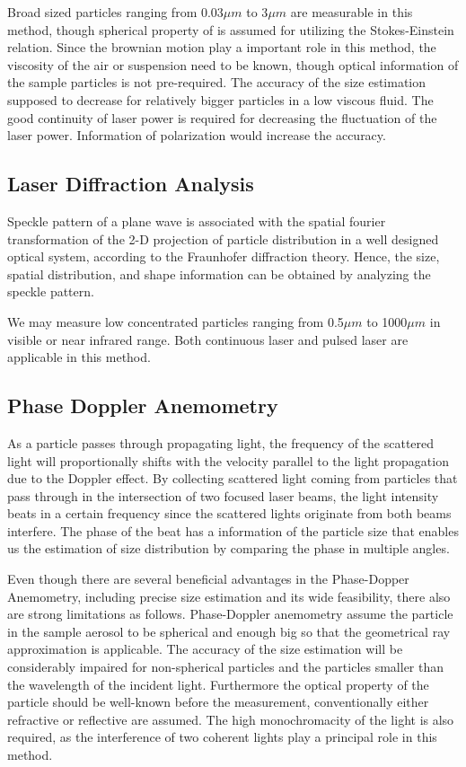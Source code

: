 \documentclass[12pt]{article}
\begin{document}
Broad sized particles ranging from 0.03$\mu m$ to 3$\mu m$ are measurable in this method, though spherical property of  is assumed for utilizing the Stokes-Einstein relation.
Since the brownian motion play a important role in this method, the viscosity of the air or suspension need to be known, though optical information of the sample particles is not pre-required. The accuracy of the size estimation supposed to decrease for relatively bigger particles in a low viscous fluid.
The good continuity of laser power is required for decreasing the fluctuation of the laser power. Information of polarization would increase the accuracy\cite{Depolarized_DLS}.

\subsection{Laser Diffraction Analysis}
Speckle pattern of a plane wave is associated with the spatial fourier transformation of the 2-D projection of particle distribution in a well designed optical system, according to the Fraunhofer diffraction theory. Hence, the size, spatial distribution, and shape information can be obtained by analyzing the speckle pattern\cite{LD_size_shape}\cite{LD_shape_characterization}.

We may measure low concentrated particles ranging from 0.5$\mu m$ to 1000$\mu m$   in visible or near infrared range.
Both continuous laser and pulsed laser are applicable in this method.

\subsection{Phase Doppler Anemometry}
As a particle passes through propagating light, the frequency of the scattered light will proportionally shifts with the velocity parallel to the light propagation due to the Doppler effect. By collecting scattered light coming from particles that pass through in the intersection of two focused laser beams, the light intensity beats in a certain frequency since the scattered lights originate from both beams interfere.  The phase of the beat has a information of the particle size that enables us the estimation of size distribution by comparing the phase in multiple angles\cite{PDA1}.

Even though there are several beneficial advantages in the Phase-Dopper Anemometry, including precise size estimation and its wide feasibility, there also are strong limitations as follows.
Phase-Doppler anemometry assume the particle in the sample aerosol to be spherical and enough big so that the geometrical ray approximation is applicable. The accuracy of the size estimation will be considerably impaired for non-spherical particles and the particles smaller than the wavelength of the incident light.
Furthermore the optical property of the particle should be well-known before the measurement, conventionally either refractive or reflective are assumed.  The high monochromacity of the light is also required, as the interference of two coherent lights play a principal role in this method.
\end{document}
